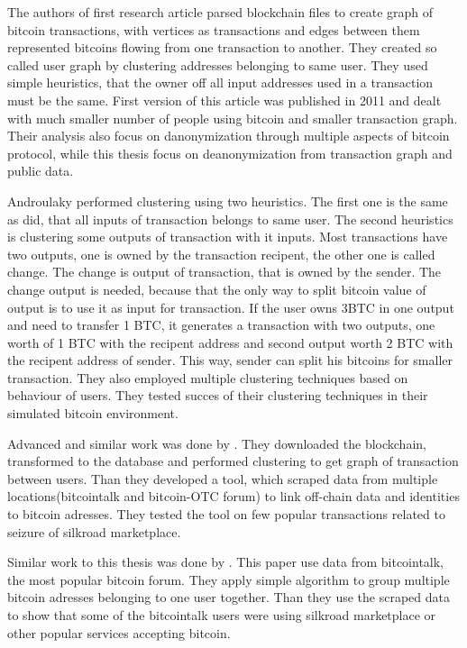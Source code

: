 \documentclass[
  digital, %
  table,   %
  lof,     %
  lot,     %
  oneside
]{fithesis3}
\begin{document}
The authors of first research article \parencite{reid2013analysis}
 parsed blockchain files to create graph of bitcoin transactions, with vertices as transactions
 and edges between them represented bitcoins flowing from one transaction to another.
 They created so called user graph by clustering addresses belonging to same user.
 They used simple heuristics, that the owner off all input addresses used
 in a transaction must be the same. First version of this article  
was published in 2011 and dealt with much smaller number of people using bitcoin and smaller transaction graph.
Their analysis also focus on danonymization through multiple aspects of bitcoin protocol,
while this thesis focus on deanonymization from transaction graph and public data.

Androulaky \parencite{androulaki2013evaluating} performed clustering using two heuristics.
The first one is the same as \parencite{reid2013analysis} did, that all inputs of transaction
belongs to same user. The second heuristics is clustering some outputs of transaction with it inputs.
Most transactions have two outputs, one is owned by the transaction recipent,
the other one is called change. The change is output of transaction, that is owned by
the sender. The change output is needed, because that the only way to split
 bitcoin value of output is to use it as input for transaction.
 If the user owns 3BTC in one output and need to transfer 1 BTC, it generates a transaction
 with two outputs, one worth of 1 BTC with the recipent address and second output worth 2 BTC 
 with the recipent address of sender. This way, sender can split his bitcoins for smaller transaction.
 They also employed multiple clustering techniques based on behaviour of users.
 They tested succes of their clustering techniques in their simulated bitcoin 
 environment.

Advanced and similar work was done by \parencite{spagnuolo2014bitiodine}. They downloaded the blockchain, transformed to the database
and performed clustering to get graph of transaction between users.
Than they developed a tool, which scraped data from multiple locations(bitcointalk and bitcoin-OTC forum) to link off-chain data and identities to bitcoin adresses.
They tested the tool on few popular transactions related to seizure of silkroad marketplace.

Similar work to this thesis was done by \parencite{fleder2015bitcoin}.
This paper use data from bitcointalk, the most popular bitcoin forum. 
They apply simple algorithm to group multiple bitcoin adresses belonging to one user together.
Than they use the scraped data to show
that some of the bitcointalk users were using silkroad marketplace or other popular services accepting bitcoin.
 
\end{document}
